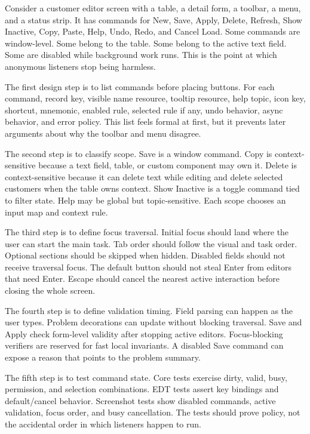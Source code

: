 Consider a customer editor screen with a table, a detail form, a toolbar, a menu, and a status strip. It has commands for New, Save, Apply, Delete, Refresh, Show Inactive, Copy, Paste, Help, Undo, Redo, and Cancel Load. Some commands are window-level. Some belong to the table. Some belong to the active text field. Some are disabled while background work runs. This is the point at which anonymous listeners stop being harmless.

The first design step is to list commands before placing buttons. For each command, record key, visible name resource, tooltip resource, help topic, icon key, shortcut, mnemonic, enabled rule, selected rule if any, undo behavior, async behavior, and error policy. This list feels formal at first, but it prevents later arguments about why the toolbar and menu disagree.

The second step is to classify scope. Save is a window command. Copy is context-sensitive because a text field, table, or custom component may own it. Delete is context-sensitive because it can delete text while editing and delete selected customers when the table owns context. Show Inactive is a toggle command tied to filter state. Help may be global but topic-sensitive. Each scope chooses an input map and context rule.

The third step is to define focus traversal. Initial focus should land where the user can start the main task. Tab order should follow the visual and task order. Optional sections should be skipped when hidden. Disabled fields should not receive traversal focus. The default button should not steal Enter from editors that need Enter. Escape should cancel the nearest active interaction before closing the whole screen.

The fourth step is to define validation timing. Field parsing can happen as the user types. Problem decorations can update without blocking traversal. Save and Apply check form-level validity after stopping active editors. Focus-blocking verifiers are reserved for fast local invariants. A disabled Save command can expose a reason that points to the problem summary.

The fifth step is to test command state. Core tests exercise dirty, valid, busy, permission, and selection combinations. EDT tests assert key bindings and default/cancel behavior. Screenshot tests show disabled commands, active validation, focus order, and busy cancellation. The tests should prove policy, not the accidental order in which listeners happen to run.

